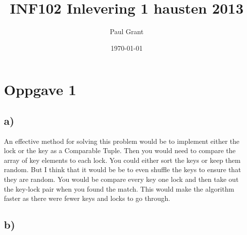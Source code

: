 \documentclass[a4paper]{article}
\begin{document}
\title{INF102 Inlevering 1 hausten 2013}
\author{Paul Grant}
\date{\today}
\maketitle
\section*{Oppgave 1}
\subsection*{a)}
 An effective method for solving this problem would be to implement
 either the lock or the key as a Comparable Tuple. Then you would need
 to compare the array of key elements to each lock. You could either sort 
 the keys or keep them random. But I think that it would be be to even
 shuffle the keys to ensure that they are random. You would be compare every key one lock and then take out the key-lock pair when you found the match.
 This would make the algorithm faster as there were fewer keys and locks to go through.
 \subsection*{b)}
\end{document}

